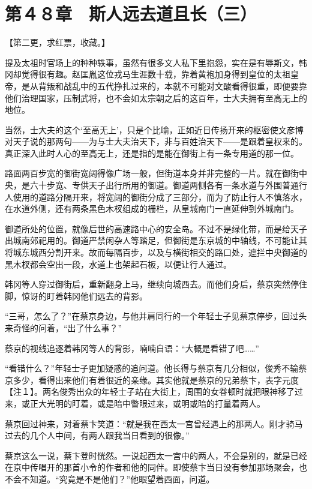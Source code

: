 \section{第４８章　斯人远去道且长（三）}

【第二更，求红票，收藏。】

提及太祖时官场上的种种轶事，虽然有很多文人私下里抱怨，实在是有辱斯文，韩冈却觉得很有趣。赵匡胤这位戎马生涯数十载，靠着黄袍加身得到皇位的太祖皇帝，是从背叛和战乱中的五代挣扎过来的，本就不可能对文酸看得很重，即便要靠他们治理国家，压制武将，也不会如太宗朝之后的这百年，士大夫拥有至高无上的地位。

当然，士大夫的这个‘至高无上’，只是个比喻，正如近日传扬开来的枢密使文彦博对天子说的那两句——为与士大夫治天下，非与百姓治天下——是跟着皇权来的。真正深入此时人心的至高无上，还是指的是能在御街上有一条专用道的那一位。

路面两百步宽的御街宽阔得像广场一般，但街道本身并非完整的一片。就在御街中央，是六十步宽、专供天子出行所用的御道。御道两侧各有一条水道与外围普通行人使用的道路分隔开来，将宽阔的御街分成了三部分，而为了防止行人不慎落水，在水道外侧，还有两条黑色木杈组成的栅栏，从皇城南门一直延伸到外城南门。

御道所处的位置，就像后世的高速路中心的安全岛。不过不是绿化带，而是给天子出城南郊祀用的。御道严禁闲杂人等踏足，但御街是东京城的中轴线，不可能让其将城东城西分割开来。故而每隔百步，以及与横街相交的路口处，遮拦中央御道的黑木杈都会空出一段，水道上也架起石板，以便让行人通过。

韩冈等人穿过御街后，重新翻身上马，继续向城西去。而他们身后，蔡京突然停住脚，惊讶的盯着韩冈他们远去的背影。

“三哥，怎么了？”在蔡京身边，与他并肩同行的一个年轻士子见蔡京停步，回过头来奇怪的问着，“出了什么事？”

蔡京的视线追逐着韩冈等人的背影，喃喃自语：“大概是看错了吧……”

“看错什么？”年轻士子更加疑惑的追问道。他长得与蔡京有几分相似，俊秀不输蔡京多少，看得出来他们有着很近的亲缘。其实他就是蔡京的兄弟蔡卞，表字元度【注１】。两名俊秀出众的年轻士子站在大街上，周围的女眷顿时就把眼神移了过来，或正大光明的盯着，或是暗中瞥眼过来，或明或暗的打量着两人。

蔡京回过神来，对着蔡卞笑道：“就是我在西太一宫曾经遇上的那两人。刚才骑马过去的几个人中间，有两人跟我当日看到的很像。”

蔡京这么一说，蔡卞登时恍然。一说起西太一宫中的两人，不会是别的，就是已经在京中传唱开的那首小令的作者和他的同伴。即使蔡卞当日没有参加那场聚会，也不会不知道。“究竟是不是他们？”他眼望着西面，问道。

